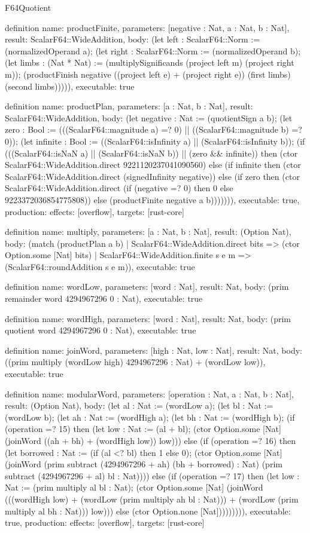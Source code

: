 \begin{lexlean}{F64Quotient}
\begin{semanticmodule}
definition{
  name: productFinite,
  parameters: [negative : Nat, a : Nat, b : Nat],
  result: ScalarF64::WideAddition,
  body: (let left : ScalarF64::Norm := (normalizedOperand a); (let right : ScalarF64::Norm := (normalizedOperand b); (let limbs : (Nat * Nat) := (multiplySignificands (project left m) (project right m)); (productFinish negative ((project left e) + (project right e)) (first limbs) (second limbs))))),
  executable: true
}

definition{
  name: productPlan,
  parameters: [a : Nat, b : Nat],
  result: ScalarF64::WideAddition,
  body: (let negative : Nat := (quotientSign a b); (let zero : Bool := (((ScalarF64::magnitude a) =? 0) || ((ScalarF64::magnitude b) =? 0)); (let infinite : Bool := ((ScalarF64::isInfinity a) || (ScalarF64::isInfinity b)); (if (((ScalarF64::isNaN a) || (ScalarF64::isNaN b)) || (zero && infinite)) then (ctor ScalarF64::WideAddition.direct 9221120237041090560) else (if infinite then (ctor ScalarF64::WideAddition.direct (signedInfinity negative)) else (if zero then (ctor ScalarF64::WideAddition.direct (if (negative =? 0) then 0 else 9223372036854775808)) else (productFinite negative a b))))))),
  executable: true,
  production: {effects: [overflow], targets: [rust-core]}
}

definition{
  name: multiply,
  parameters: [a : Nat, b : Nat],
  result: (Option Nat),
  body: (match (productPlan a b)
    | ScalarF64::WideAddition.direct bits => (ctor Option.some [Nat] bits)
    | ScalarF64::WideAddition.finite s e m => (ScalarF64::roundAddition s e m)),
  executable: true
}

definition{
  name: wordLow,
  parameters: [word : Nat],
  result: Nat,
  body: (prim remainder word 4294967296 0 : Nat),
  executable: true
}

definition{
  name: wordHigh,
  parameters: [word : Nat],
  result: Nat,
  body: (prim quotient word 4294967296 0 : Nat),
  executable: true
}

definition{
  name: joinWord,
  parameters: [high : Nat, low : Nat],
  result: Nat,
  body: ((prim multiply (wordLow high) 4294967296 : Nat) + (wordLow low)),
  executable: true
}

definition{
  name: modularWord,
  parameters: [operation : Nat, a : Nat, b : Nat],
  result: (Option Nat),
  body: (let al : Nat := (wordLow a); (let bl : Nat := (wordLow b); (let ah : Nat := (wordHigh a); (let bh : Nat := (wordHigh b); (if (operation =? 15) then (let low : Nat := (al + bl); (ctor Option.some [Nat] (joinWord ((ah + bh) + (wordHigh low)) low))) else (if (operation =? 16) then (let borrowed : Nat := (if (al <? bl) then 1 else 0); (ctor Option.some [Nat] (joinWord (prim subtract (4294967296 + ah) (bh + borrowed) : Nat) (prim subtract (4294967296 + al) bl : Nat)))) else (if (operation =? 17) then (let low : Nat := (prim multiply al bl : Nat); (ctor Option.some [Nat] (joinWord (((wordHigh low) + (wordLow (prim multiply ah bl : Nat))) + (wordLow (prim multiply al bh : Nat))) low))) else (ctor Option.none [Nat])))))))),
  executable: true,
  production: {effects: [overflow], targets: [rust-core]}
}


\end{semanticmodule}
\end{lexlean}
